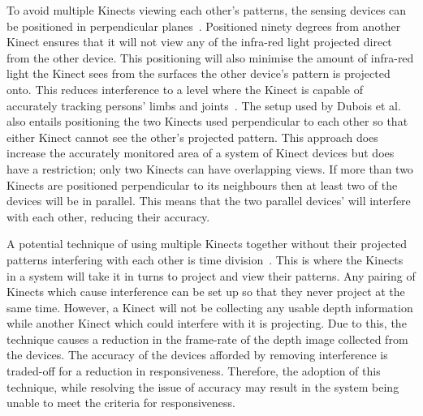\documentclass[link]{IWCOMP}
\begin{document}
To avoid multiple Kinects viewing each other's patterns, the sensing devices can be positioned in perpendicular planes~\cite{Caon2011,Kramer2012}.
Positioned ninety degrees from another Kinect ensures that it will not view any of the infra-red light projected direct from the other device.
This positioning will also minimise the amount of infra-red light the Kinect sees from the surfaces the other device's pattern is projected onto.
This reduces interference to a level where the Kinect is capable of accurately tracking persons' limbs and joints~\cite{Caon2011}.
The setup used by Dubois et al.~\cite{Dubois2011} also entails positioning the two Kinects used perpendicular to each other so that either Kinect cannot see the other's projected pattern.
This approach does increase the accurately monitored area of a system of Kinect devices but does have a restriction; only two Kinects can have overlapping views.
If more than two Kinects are positioned perpendicular to its neighbours then at least two of the devices will be in parallel.
This means that the two parallel devices' will interfere with each other, reducing their accuracy.

A potential technique of using multiple Kinects together without their projected patterns interfering with each other is time division~\cite{Schroder2011}.
This is where the Kinects in a system will take it in turns to project and view their patterns.
Any pairing of Kinects which cause interference can be set up so that they never project at the same time.
However, a Kinect will not be collecting any usable depth information while another Kinect which could interfere with it is projecting.
Due to this,  the technique causes a reduction in the frame-rate of the depth image collected from the devices.
The accuracy of the devices afforded by removing interference is traded-off for a reduction in responsiveness.
Therefore, the adoption of this technique, while resolving the issue of accuracy may result in the system being unable to meet the criteria for responsiveness.
\end{document}

